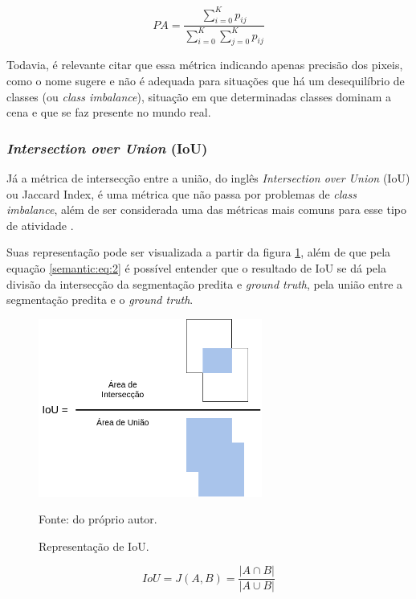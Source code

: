 \begin{equation}
    \label{semantic:eq:1}
    PA = \frac{\sum_{i=0}^{K} p_{ij}}{\sum_{i=0}^{K} \sum_{j=0}^{K} p_{ij}}
\end{equation}

Todavia, é relevante citar que essa métrica indicando apenas precisão dos pixeis, como o nome sugere e não é adequada para situações que há um desequilíbrio de classes (ou \textit{class imbalance}), situação em que determinadas classes dominam a cena e que se faz presente no mundo real.


\subsubsection{\textit{Intersection over Union} (IoU)}
\label{semantic:IoU}

Já a métrica de intersecção entre a união, do inglês \textit{Intersection over Union} (IoU) ou Jaccard Index, é uma métrica que não passa por problemas de \textit{class imbalance}, além de ser considerada uma das métricas mais comuns para esse tipo de atividade \cite{Minaee2021}.

Suas representação pode ser visualizada a partir da figura \ref{semantic:fig:1}, além de que pela equação \ref{semantic:eq:2} é possível entender que o resultado de IoU se dá pela divisão da intersecção da segmentação predita e \textit{ground truth}, pela união entre a segmentação predita e o \textit{ground truth}.

\begin{figure}[H]
    \centering
    \caption{Representação de IoU.}
    \includegraphics[height=2.3in]{recursos/imagens/semantic/IoU.png}
    \label{semantic:fig:1}

    \vspace*{1 cm}
    Fonte: do próprio autor.
\end{figure}

\begin{equation}
    \label{semantic:eq:2}
    IoU = J(A,B) = \frac{|A \cap B|}{|A \cup B|}
\end{equation}

